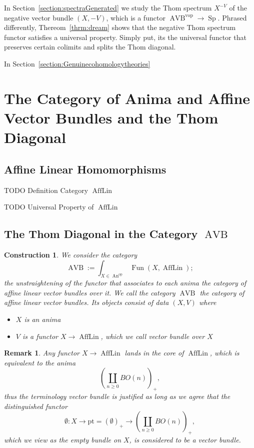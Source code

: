\documentclass{article}
\newcommand{\pt}{\mathrm{pt}}
\newcommand{\op}{\mathrm{op}}
\newcommand{\vop}{\mathrm{vop}}
\DeclareMathOperator{\AVB}{AVB}
\DeclareMathOperator{\An}{An}
\DeclareMathOperator{\Sp}{Sp}
\DeclareMathOperator{\Fun}{Fun}
\DeclareMathOperator{\AffLin}{AffLin}
\newtheorem{construction}{Construction}
\newtheorem{remark}{Remark}
\begin{document}
In Section~\ref{section:spectraGenerated} we study the Thom spectrum $X^{-V}$ of the negative vector bundle $(X,-V)$, which 
is a functor $\AVB^\vop \to \Sp$. Phrased differently, Thereom~\ref{thrm:dream} shows that the 
negative Thom spectrum functor satisfies a universal property. 
Simply put, its the universal functor that preserves certain colimits and splits the 
Thom diagonal.

In Section~\ref{section:Genuinecohomologytheories}






\section{The Category of Anima and Affine Vector Bundles and the Thom Diagonal}\label{sec:AVBs}

\subsection{Affine Linear Homomorphisms}\label{sec:AffLin}

TODO Definition Category $\AffLin$ 


TODO Universal Property of $\AffLin$

\subsection{The Thom Diagonal in the Category $\AVB$}\label{section:ThomDiagonal}
\begin{construction}
    We consider the category 
    \[ 
        \AVB := \int_{X \in \An^\op} \Fun(X, \AffLin);
    \] 
    the unstraightening of the functor that associates to 
    each anima the category of 
    affine linear vector bundles over it. 
    We call the category $\AVB$ \emph{the category of affine linear 
    vector bundles}.
    Its objects consist of data $(X,V)$ where 
    \begin{itemize}
        \item $X$ is an anima 
        \item $V$ is a functor $X \to \AffLin$, which we call \emph{vector bundle over $X$}
    \end{itemize}


\end{construction}

\begin{remark}
    Any functor $X \to \AffLin$ lands in the core of $\AffLin$, which is 
    equivalent to the anima
    \[ 
        \left( \coprod_{n \geq 0} BO(n) \right)_+,
    \] 
    thus the terminology vector bundle is justified as long as we agree
    that the distinguished functor 
    \[
       \emptyset \colon  X \to \pt = (\emptyset)_+ \to \left(\coprod_{n \geq 0} BO(n)\right)_+,  
    \]
    which we view as the \emph{empty bundle} on $X$, is considered to be a vector bundle.
\end{remark}
\end{document}
